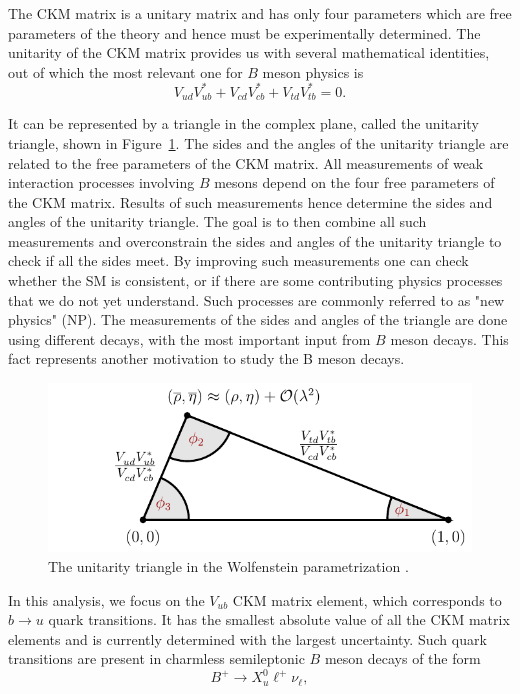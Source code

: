 The CKM matrix is a unitary matrix and has only four parameters which are free parameters of the theory and hence must be experimentally determined. The unitarity of the CKM matrix provides us with several mathematical identities, out of which the most relevant one for $B$ meson physics is  
\begin{equation}
V_{ud}V_{ub}^* + V_{cd}V_{cb}^* + V_{td}V_{tb}^* = 0.
\end{equation}

It can be represented by a triangle in the complex plane, called the unitarity triangle, shown in Figure~\ref{ut}. The sides and the angles of the unitarity triangle are related to the free parameters of the CKM matrix. All measurements of weak interaction processes involving $B$ mesons depend on the four free parameters of the CKM matrix. Results of such measurements hence determine the sides and angles of the unitarity triangle. The goal is to then combine all such measurements and overconstrain the sides and angles of the unitarity triangle to check if all the sides meet. By improving such measurements one can check whether the SM is consistent, or if there are some contributing physics processes that we do not yet understand. Such processes are commonly referred to as "new physics" (NP). The measurements of the sides and angles of the triangle are done using different decays, with the most important input from $B$ meson decays. This fact represents another motivation to study the B meson decays.

\begin{figure}[H]
	\centering
	\includegraphics[scale=1]{texfig/UT_Triangle}
	\captionsetup{width=.8\linewidth}
	\caption{The unitarity triangle in the Wolfenstein parametrization \cite{PhysRevLett.51.1945}.}
	\label{ut}
\end{figure}

In this analysis, we focus on the $V_{ub}$ CKM matrix element, which corresponds to $b \to u$ quark transitions. It has the smallest absolute value of all the CKM matrix elements and is currently determined with the largest uncertainty. Such quark transitions are present in charmless semileptonic $B$ meson decays of the form
\begin{equation}
B^+ \to X_u^0 \ell^+ \nu_\ell,
\end{equation}

